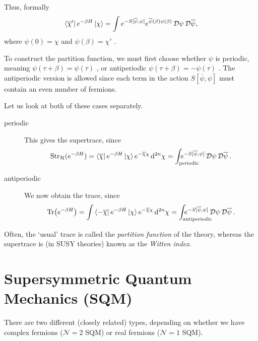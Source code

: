 Thus, formally
\begin{equation}
  \bra{\overline{\chi}{}'} e^{-\beta H} \ket{\chi} = \int e^{-S[\overline{\psi}{}, \psi]} e^{\overline{\psi}{}(\beta) \psi(\beta)} \mathop{\mathcal{D} \psi} \mathop{\mathcal{D} \overline{\psi}{}},
\end{equation}
where $\psi(0) = \chi$  and $\psi(\beta) = \chi'$ .

To construct the partition function, we must first choose whether $\psi$  is periodic, meaning $\psi(\tau + \beta) = \psi(\tau)$ , or antiperiodic $\psi(\tau + \beta) = -\psi(\tau)$ . The antiperiodic version is allowed since each term in the action $S[\overline{\psi}{}, \psi]$ must contain an even number of fermions.

Let us look at both of these cases separately.
\begin{description}
  \item[periodic] This gives the supertrace, since
    \begin{equation}
      \text{Str}_{\mathcal{H}}(e^{-\beta H}) = \bra{\overline \chi} e^{- \beta H} \ket{\chi} e^{- \overline{\chi}{} \chi} \dd[2n]{\chi} = \int_{\mathrlap{\text{periodic}}} e^{-S[\overline{\psi}{}, \psi]} \pdd{\psi} \pdd{\overline{\psi}{}}.
    \end{equation}
  \item[antiperiodic] We now obtain the trace, since
    \begin{equation}
      \Tr(e^{-\beta H}) = \int \bra{- \overline{\chi}{}} e^{- \beta H} \ket{\chi} e^{- \overline{\chi}{} \chi} \dd[2n]{\chi} = \int_{\mathrlap{\text{antiperiodic}}} e^{-S[\overline{\psi}{}, \psi]} \pdd{\psi} \pdd{\overline{\psi}{}}.
    \end{equation}
\end{description}
\begin{remark}
  Often, the `usual' trace is called the \emph{partition function} of the theory, whereas the supertrace is (in SUSY theories) known as the \emph{Witten index}.
\end{remark}

\section{Supersymmetric Quantum Mechanics (SQM)}%
\label{sec:supersymmetric_quantum_mechanics_sqm_}

There are two different (closely related) types, depending on whether we have complex fermions ($\mathcal{N} = 2$ SQM) or real fermions ($\mathcal{N} = 1$ SQM).

